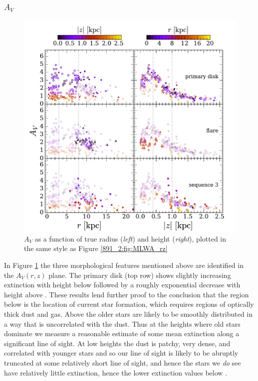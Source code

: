 \subsubsection{{\Large $A_V$}}

\begin{figure}
  \centering
  \includegraphics[width=\textwidth]{891_2/figs/AV_rz_all.pdf}
  \caption[$A_V$ vs ($r,|z|$)]{\fixspacing\label{891_2:fig:AV_rz}$A_V$
    as a function of true radius (\emph{left}) and height
    (\emph{right}), plotted in the same style as Figure
    \ref{891_2:fig:MLWA_rz}}
\end{figure}

In Figure \ref{891_2:fig:AV_rz} the three morphological features mentioned
above are identified in the $A_V(r,z)$ plane. The primary disk (top
row) shows slightly increasing extinction with height below  followed by a roughly exponential decrease with height
above . These results lend further proof to the
conclusion that the region below  is the location of
current star formation, which requires regions of optically thick dust
and gas. Above  the older stars are likely to be
smoothly distributed in a way that is uncorrelated with the dust. Thus
at the heights where old stars dominate we measure a reasonable
estimate of some mean extinction along a significant line of sight. At
low heights the dust is patchy, very dense, and correlated with
younger stars and so our line of sight is likely to be abruptly
truncated at some relatively short line of sight, and hence the stars
we \emph{do} see have relatively little extinction, hence the lower
extinction values below .

